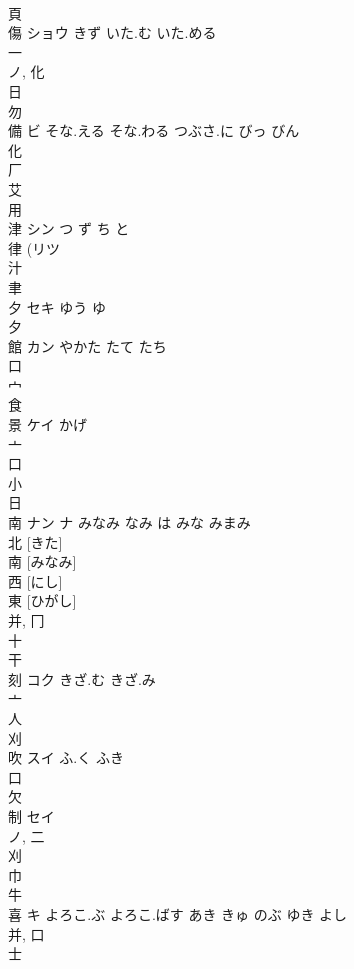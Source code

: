 \documentclass[8pt]{extreport}
\begin{document}
\begin{CJK}{UTF8}{min}
\\	頁 
\\	傷	ショウ	きず いた.む いた.める	
\\	一 
\\	ノ, 化 
\\	日 
\\	勿 
\\	備	ビ	そな.える そな.わる つぶさ.に びっ びん	
\\	化 
\\	厂 
\\	艾 
\\	用 
\\	津	シン	つ ず ち と	
\\	律 (リツ 
\\	汁 
\\	聿 
\\	夕	セキ	ゆう ゆ	
\\	夕 
\\	館	カン	やかた たて たち	
\\	口 
\\	宀 
\\	食 
\\	景	ケイ	かげ	
\\	亠 
\\	口 
\\	小 
\\	日 
\\	南	ナン ナ	みなみ なみ は みな みまみ	
\\	北 [きた] 
\\	南 [みなみ] 
\\	西 [にし] 
\\	東 [ひがし] 
\\	并, 冂 
\\	十 
\\	干 
\\	刻	コク	きざ.む きざ.み	
\\	亠 
\\	人 
\\	刈 
\\	吹	スイ	ふ.く ふき	
\\	口 
\\	欠 
\\	制	セイ		
\\	ノ, 二 
\\	刈 
\\	巾 
\\	牛 
\\	喜	キ	よろこ.ぶ よろこ.ばす あき きゅ のぶ ゆき よし	
\\	并, 口 
\\	士 

\end{CJK}
\end{document}
